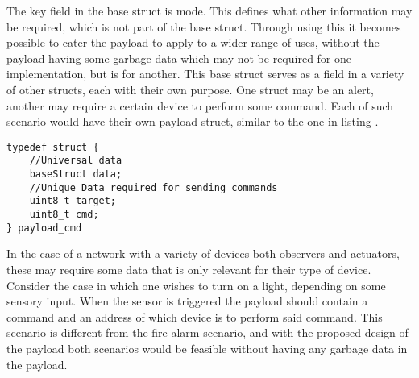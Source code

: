 \bigskip \noindent
{}
The key field in the base struct is mode.
This defines what other information may be required, which is not part of the base struct.
Through using this it becomes possible to cater the payload to apply to a wider range of uses, without the payload having some garbage data which may not be required for one implementation, but is for another.
This base struct serves as a field in a variety of other structs, each with their own purpose.
One struct may be an alert, another may require a certain device to perform some command.
Each of such scenario would have their own payload struct, similar to the one in listing .

\bigskip \noindent
\begin{lstlisting}[style=customc,caption={A possible way a struct for designating commands could look in the payload},label={cmdStruct}]
typedef struct { 
    //Universal data
    baseStruct data;
    //Unique Data required for sending commands
    uint8_t target;
    uint8_t cmd;
} payload_cmd
\end{lstlisting}
\bigskip \noindent

In the case of a network with a variety of devices both observers and actuators, these may require some data that is only relevant for their type of device.
Consider the case in which one wishes to turn on a light, depending on some sensory input.
When the sensor is triggered the payload should contain a command and an address of which device is to perform said command.
This scenario is different from the fire alarm scenario, and with the proposed design of the payload both scenarios would be feasible without having any garbage data in the payload.
